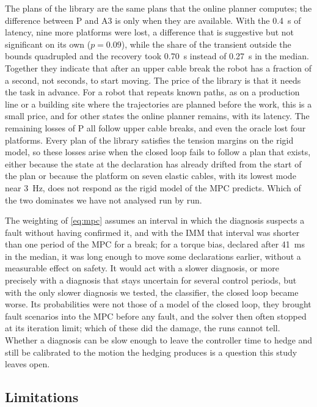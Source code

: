 \documentclass{interact}
\begin{document}
The plans of the library are the same plans that the online planner computes; the difference between P and A3 is only when they are available. With the 0.4~s of latency, nine more platforms were lost, a difference that is suggestive but not significant on its own ($p=0.09$), while the share of the transient outside the bounds quadrupled and the recovery took 0.70~s instead of 0.27~s in the median. Together they indicate that after an upper cable break the robot has a fraction of a second, not seconds, to start moving. The price of the library is that it needs the task in advance. For a robot that repeats known paths, as on a production line or a building site where the trajectories are planned before the work, this is a small price, and for other states the online planner remains, with its latency. The remaining losses of P all follow upper cable breaks, and even the oracle lost four platforms. Every plan of the library satisfies the tension margins on the rigid model, so these losses arise when the closed loop fails to follow a plan that exists, either because the state at the declaration has already drifted from the start of the plan or because the platform on seven elastic cables, with its lowest mode near 3~Hz, does not respond as the rigid model of the MPC predicts. Which of the two dominates we have not analysed run by run.

The weighting of \eqref{eq:mpc} assumes an interval in which the diagnosis suspects a fault without having confirmed it, and with the IMM that interval was shorter than one period of the MPC for a break; for a torque bias, declared after 41~ms in the median, it was long enough to move some declarations earlier, without a measurable effect on safety. It would act with a slower diagnosis, or more precisely with a diagnosis that stays uncertain for several control periods, but with the only slower diagnosis we tested, the classifier, the closed loop became worse. Its probabilities were not those of a model of the closed loop, they brought fault scenarios into the MPC before any fault, and the solver then often stopped at its iteration limit; which of these did the damage, the runs cannot tell. Whether a diagnosis can be slow enough to leave the controller time to hedge and still be calibrated to the motion the hedging produces is a question this study leaves open.

\subsection{Limitations}\label{sec:limits}
\end{document}
